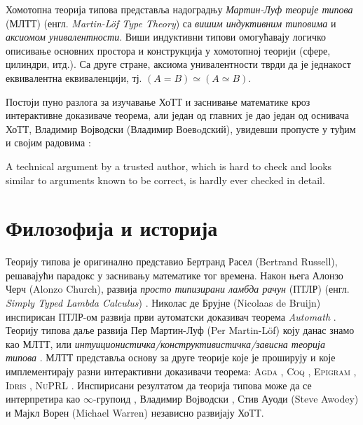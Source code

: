 \documentclass[12pt,oneside]{memoir}
\begin{document}
Хомотопна теорија типова представља надоградњу \emph{Мартин-Луф теорије типова} (МЛТТ) (енгл. \emph{Martin-Löf Type Theory}) са \emph{вишим индуктивним типовима} и \emph{аксиомом унивалентности}. Виши индуктивни типови омогућавају логичко описивање основних простора и конструкција у хомотопној теорији (сфере, цилиндри, итд.). Са друге стране, аксиома унивалентности тврди да је једнакост еквивалентна еквиваленцији, тј. $(A = B) \simeq (A \simeq B)$.

Постоји пуно разлога за изучавање ХоТТ и заснивање математике кроз интерактивне доказиваче теорема, али један од главних је дао један од оснивача ХоТТ, Владимир Војводски (Владимир Воевoдский), увидевши пропусте у туђим и својим радовима \cite{vlad14}:

\begin{displayquote}
    A technical argument by a trusted author, which is hard to check and looks similar to arguments known to be correct, is hardly ever checked in detail.
\end{displayquote}

\section{Филозофија и историја}

Теорију типова је оригинално представио Бертранд Расел \cite{rus08} (Bertrand Russell), решавајући парадокс у заснивању математике тог времена. Након њега Алонзо Черч (Alonzo Church), развија \emph{просто типизирани ламбда рачун} (ПТЛР) (енгл. \emph{Simply Typed Lambda Calculus}) \cite{crc40, crc41}. Николас де Брујне (Nicolaas de Bruijn) инспирисан ПТЛР-ом развија први аутоматски доказивач теорема \emph{Automath} \cite{automath}. Теорију типова даље развија Пер Мартин-Луф (Per Martin-Löf) коју данас знамо као МЛТТ, или \emph{интуиционистичка/конструктивистичка/зависна теорија типова} \cite{pml75, pml82, pml84, pml98}. МЛТТ представља основу за друге теорије које је проширују и које имплементирају разни интерактивни доказивачи теорема: \textsc{Agda} \cite{agda}, \textsc{Coq} \cite{coq}, \textsc{Epigram} \cite{epigram}, \textsc{Idris} \cite{idris}, \textsc{NuPRL} \cite{nuprl}. Инспирисани резултатом да теорија типова може да се интерпретира као $\infty$-групоид \cite{hs98}, Владимир Воjводски \cite{vlad06}, Стив Ауоди (Steve Awodey) и Мајкл Ворен (Michael Warren) \cite{aw09} независно развијају ХоТТ.
\end{document}
